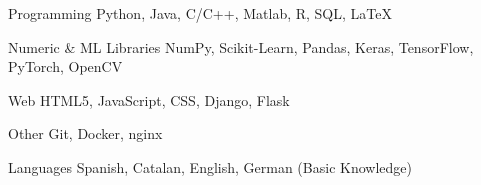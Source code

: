 
\begin{cvskills}

\cvskill
	{Programming}
	{Python, Java, C/C++, Matlab, R, SQL, \LaTeX}

\cvskill
	{Numeric \& ML Libraries}
	{NumPy, Scikit-Learn, Pandas, Keras, TensorFlow, PyTorch, OpenCV}

\cvskill
	{Web}
	{HTML5, JavaScript, CSS, Django, Flask}

\cvskill
	{Other}
	{Git, Docker, nginx}

\cvskill
	{Languages}
	{Spanish, Catalan, English, German (Basic Knowledge)}

\end{cvskills}
